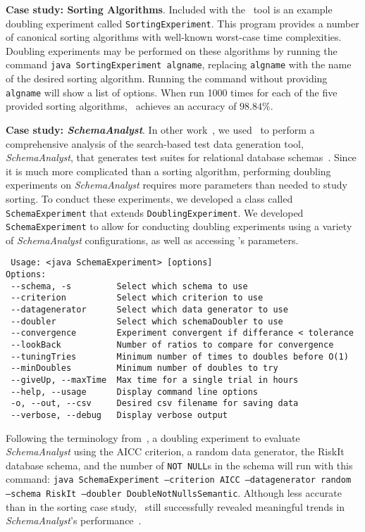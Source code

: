     \lstset{language=bash}

    {\bf Case study: Sorting Algorithms}.  Included with the
    \toolname~tool is an example doubling experiment called
    \texttt{SortingExperiment}.  This program provides a number of
    canonical sorting algorithms with well-known worst-case time
    complexities.  Doubling experiments may be performed on these
    algorithms by running the command \texttt{java SortingExperiment
    algname}, replacing \texttt{algname} with the name of the desired
    sorting algorithm. Running the command without providing
    \texttt{algname} will show a list of options. When run 1000 times
    for each of the five provided sorting algorithms, \toolname~achieves
    an accuracy of $98.84\%$.

    {\bf Case study: \textit{SchemaAnalyst}}. In other
    work~\cite{kinneer2015}, we used \toolname~to perform a
    comprehensive analysis of the search-based test data generation
    tool, \textit{SchemaAnalyst}, that generates test suites for
    relational database schemas~\cite{kapfhammer2013}. Since it is much
    more complicated than a sorting algorithm, performing doubling
    experiments on \textit{SchemaAnalyst} requires more parameters than
    needed to study sorting.  To conduct these experiments, we developed
    a class called \texttt{SchemaExperiment} that extends
    \texttt{DoublingExperiment}.  We developed \texttt{SchemaExperiment}
    to allow for conducting doubling experiments using a variety of
    \textit{SchemaAnalyst} configurations, as well as accessing
    \toolname's parameters.

    \vspace*{-.075in}

{\scriptsize
\begin{verbatim}
 Usage: <java SchemaExperiment> [options]
Options:
 --schema, -s         Select which schema to use
 --criterion          Select which criterion to use
 --datagenerator      Select which data generator to use
 --doubler            Select which schemaDoubler to use
 --convergence        Experiment convergent if differance < tolerance
 --lookBack           Number of ratios to compare for convergence
 --tuningTries        Minimum number of times to doubles before O(1)
 --minDoubles         Minimum number of doubles to try
 --giveUp, --maxTime  Max time for a single trial in hours
 --help, --usage      Display command line options
 -o, --out, --csv     Desired csv filename for saving data 
 --verbose, --debug   Display verbose output
\end{verbatim}
}

\vspace*{-.075in}

Following the terminology from~\cite{kempka2015}, a doubling experiment
to evaluate \textit{SchemaAnalyst} using the AICC criterion, a random
data generator, the RiskIt database schema, and the number of
\texttt{NOT NULL}s in the schema will run with this command:
\texttt{java SchemaExperiment --criterion AICC --datagenerator random
--schema RiskIt --doubler DoubleNotNullsSemantic}.  Although less accurate
than in the sorting case study, \toolname~still successfully revealed
meaningful trends in \textit{SchemaAnalyst}'s
performance~\cite{kinneer2015}.


